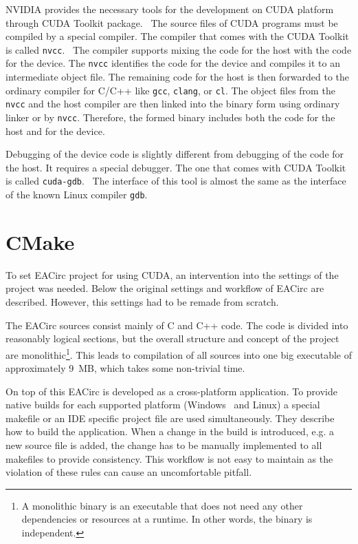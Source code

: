 \documentclass[12pt,oneside]{fithesis2}
\begin{document}
NVIDIA provides the necessary tools for the development on CUDA platform through CUDA Toolkit package.~\cite{cuda_toolkit} The source files of CUDA programs must be compiled by a special compiler. The compiler that comes with the CUDA Toolkit is called \texttt{nvcc}.~\cite{cuda_compiler} The compiler supports mixing the code for the host with the code for the device. The \texttt{nvcc} identifies the code for the device and compiles it to an intermediate object file. The remaining code for the host is then forwarded to the ordinary compiler for C/C++ like \texttt{gcc}, \texttt{clang}, or \texttt{cl}. The object files from the \texttt{nvcc} and the host compiler are then linked into the binary form using ordinary linker or by \texttt{nvcc}. Therefore, the formed binary includes both the code for the host and for the device.

Debugging of the device code is slightly different from debugging of the code for the host. It requires a special debugger. The one that comes with CUDA Toolkit is called \texttt{cuda-gdb}.~\cite{cuda_gdb} The interface of this tool is almost the same as the interface of the known Linux compiler \texttt{gdb}.






\chapter{CMake}

To set EACirc project for using CUDA, an intervention into the settings of the project was needed. Below the original settings and workflow of EACirc are described. However, this settings had to be remade from scratch.

The EACirc sources consist mainly of C and C++ code. The code is divided into reasonably logical sections, but the overall structure and concept of the project are monolithic\footnote{A monolithic binary is an executable that does not need any other dependencies or resources at a runtime. In other words, the binary is independent.}. This leads to compilation of all sources into one big executable of approximately 9~MB, which takes some non-trivial time.

On top of this EACirc is developed as a cross-platform application. To provide native builds for each supported platform (Windows~\cite{win} and Linux) a special makefile or an IDE specific project file are used simultaneously. They describe how to build the application. When a change in the build is introduced, e.g. a new source file is added, the change has to be manually implemented to all makefiles to provide consistency. This workflow is not easy to maintain as the violation of these rules can cause an uncomfortable pitfall.
\end{document}
